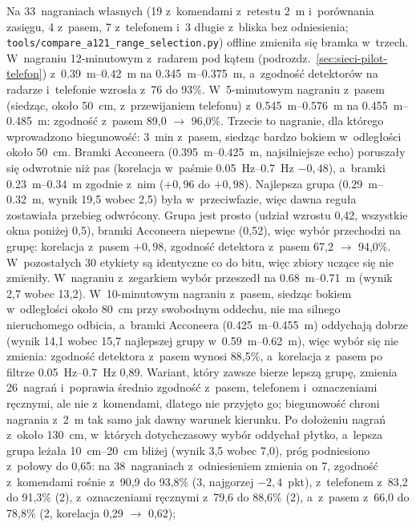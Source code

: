 \documentclass[12pt,a4paper,oneside]{report}
\begin{document}
Na 33~nagraniach własnych (19 z~komendami z~retestu \SI{2}{m} i~porównania
zasięgu, 4 z~pasem, 7 z~telefonem i~3 długie z~bliska bez odniesienia;
\texttt{tools/compare\_a121\_range\_selection.py}) offline zmieniła się bramka
w~trzech. W~nagraniu 12-minutowym z~radarem pod kątem
(podrozdz.~\ref{sec:sieci-pilot-telefon}) z~\SIrange{0.39}{0.42}{m} na
\SIrange{0.345}{0.375}{m}, a~zgodność detektorów na radarze i~telefonie
wzrosła z~76 do 93\%. W~5-minutowym nagraniu z~pasem (siedząc,
około \SI{50}{cm}, z~przewijaniem telefonu) z~\SIrange{0.545}{0.576}{m} na
\SIrange{0.455}{0.485}{m}: zgodność z~pasem 89,0 $\rightarrow$ 96,0\%.
Trzecie to nagranie, dla którego wprowadzono biegunowość: \SI{3}{min}
z~pasem, siedząc bardzo bokiem w~odległości około \SI{50}{cm}. Bramki
Acconeera (\SIrange{0.395}{0.425}{m}, najsilniejsze echo) poruszały się
odwrotnie niż pas (korelacja w~paśmie \SIrange{0.05}{0.7}{Hz} $-0{,}48$),
a~bramki \SIrange{0.23}{0.34}{m} zgodnie z~nim ($+0{,}96$ do $+0{,}98$).
Najlepsza grupa (\SIrange{0.29}{0.32}{m}, wynik 19,5 wobec 2,5) była
w~przeciwfazie, więc dawna reguła zostawiała przebieg odwrócony. Grupa jest
prosto (udział wzrostu 0,42, wszystkie okna poniżej 0,5), bramki Acconeera
niepewne (0,52), więc wybór przechodzi na grupę: korelacja z~pasem
$+0{,}98$, zgodność detektora z~pasem 67,2 $\rightarrow$ 94,0\%.
W~pozostałych 30 etykiety są identyczne co do bitu, więc zbiory uczące się
nie zmieniły. W~nagraniu z~zegarkiem wybór przeszedł na
\SIrange{0.68}{0.71}{m} (wynik 2,7 wobec 13,2). W~10-minutowym nagraniu
z~pasem, siedząc bokiem w~odległości około \SI{80}{cm} przy swobodnym oddechu,
nie ma silnego nieruchomego odbicia, a~bramki Acconeera
(\SIrange{0.425}{0.455}{m}) oddychają dobrze (wynik 14,1 wobec 15,7 najlepszej
grupy w~\SIrange{0.59}{0.62}{m}), więc wybór się nie zmienia: zgodność detektora
z~pasem wynosi 88,5\%, a~korelacja z~pasem po filtrze \SIrange{0.05}{0.7}{Hz}
0,89. Wariant, który zawsze bierze lepszą grupę, zmienia 26~nagrań
i~poprawia średnio zgodność z~pasem, telefonem i~oznaczeniami ręcznymi, ale nie
z~komendami, dlatego nie przyjęto go; biegunowość chroni nagrania z~\SI{2}{m}
tak samo jak dawny warunek kierunku. Po dołożeniu nagrań z~około \SI{130}{cm}, w~których
dotychczasowy wybór oddychał płytko, a~lepsza grupa leżała \SIrange{10}{20}{cm} bliżej (wynik 3,5 wobec 7,0),
próg podniesiono z~połowy do 0,65: na 38~nagraniach z~odniesieniem zmienia on 7, zgodność z~komendami
rośnie z~90,9 do 93,8\% (3, najgorzej $-2{,}4$~pkt), z~telefonem z~83,2 do 91,3\% (2), z~oznaczeniami
ręcznymi z~79,6 do 88,6\% (2), a~z~pasem z~66,0 do 78,8\% (2, korelacja 0,29 $\rightarrow$ 0,62);
\end{document}
